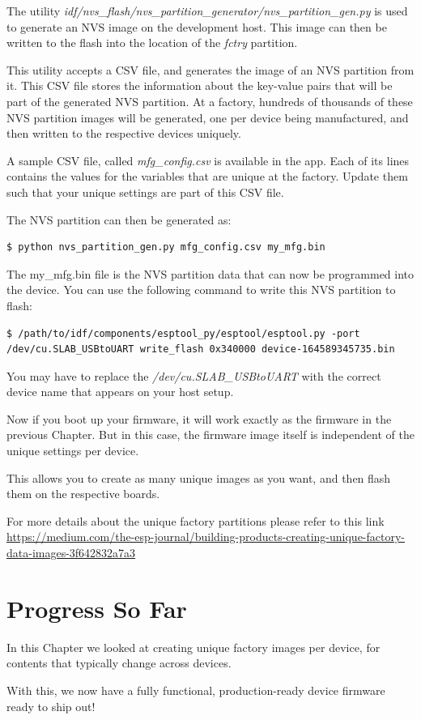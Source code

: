 \documentclass[main.tex]{subfiles}
\begin{document}
The utility \textit{idf/nvs\_flash/nvs\_partition\_generator/nvs\_partition\_gen.py} is used to generate an NVS image on the development host. This image can then be written to the flash into the location of the \textit{fctry} partition.

This utility accepts a CSV file, and generates the image of an NVS partition from it. This CSV file stores the information about the key-value pairs that will be part of the generated NVS partition. At a factory, hundreds of thousands of these NVS partition images will be generated, one per device being manufactured, and then written to the respective devices uniquely.

A sample CSV file, called \textit{mfg\_config.csv} is available in the app. Each of its lines contains the values for the variables that are unique at the factory.
Update them such that your unique settings are part of this CSV file.

The NVS partition can then be generated as:
\begin{verbatim}
$ python nvs_partition_gen.py mfg_config.csv my_mfg.bin
\end{verbatim}

The my\_mfg.bin file is the NVS partition data that can now be programmed into the device. You can use the following command to write this NVS partition to flash:
\begin{verbatim}
$ /path/to/idf/components/esptool_py/esptool/esptool.py -port /dev/cu.SLAB_USBtoUART write_flash 0x340000 device-164589345735.bin
\end{verbatim}
You may have to replace the \textit{/dev/cu.SLAB\_USBtoUART} with the correct device name that appears on your host setup.

Now if you boot up your firmware, it will work exactly as the firmware in the previous Chapter. But in this case, the firmware image itself is independent of the unique settings per device. 

This allows you to create as many unique images as you want, and then flash them on the respective boards.

For more details about the unique factory partitions please refer to this link \url{https://medium.com/the-esp-journal/building-products-creating-unique-factory-data-images-3f642832a7a3}

\section{Progress So Far}
In this Chapter we looked at creating unique factory images per device, for contents that typically change across devices.

With this, we now have a fully functional, production-ready device firmware ready to ship out!
\end{document}
